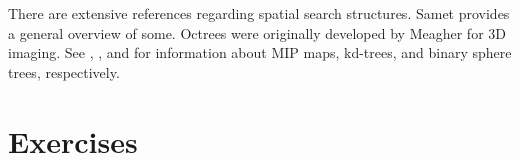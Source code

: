 There are extensive references regarding spatial search structures. Samet \cite{Samet90} provides a general overview of some. Octrees were originally developed by Meagher \cite{Meagher82} for 3D imaging. See \cite{Williams83}, \cite{Bentley75}, and \cite{Quinlan94} for information about MIP maps, kd-trees, and binary sphere trees, respectively.

\printbibliography


\section{Exercises}